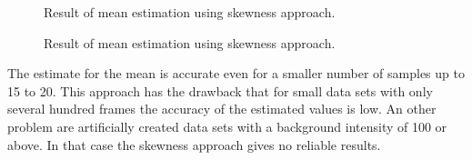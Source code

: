 \begin{figure}
\hfill
{}
	\caption{Result of mean estimation using skewness approach.}
	\label{skew1000}	
\end{figure}
\begin{figure}
\hfill
{}
	\caption{Result of mean estimation using skewness approach.}
	\label{skew100}	
\end{figure}
The estimate for the mean is accurate even for a smaller number of samples up to 15 to 20.\newline
This approach has the drawback that for small data sets with only several hundred frames the accuracy of the estimated values is low. An other problem are artificially created data sets with a background intensity of 100 or above. In that case the skewness approach gives no reliable results.

